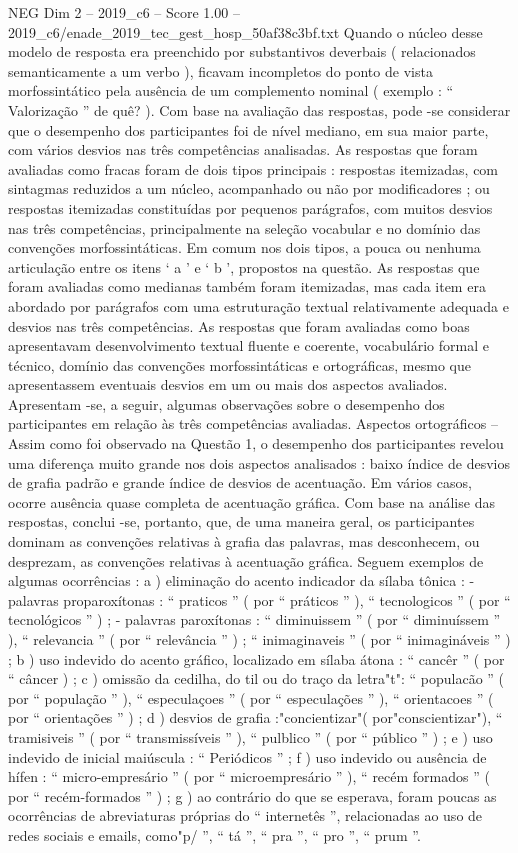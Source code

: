 \begin{textsample}{NEG Dim 2 – 2019\_c6 – Score 1.00 – 2019\_c6/enade\_2019\_tec\_gest\_hosp\_50af38c3bf.txt}
Quando o núcleo desse modelo de resposta era preenchido por substantivos deverbais ( relacionados semanticamente a um verbo ), ficavam incompletos do ponto de vista morfossintático pela ausência de um complemento nominal ( exemplo : “ Valorização ” de quê? ).
Com base na avaliação das respostas, pode -se considerar que o desempenho dos participantes foi de nível mediano, em sua maior parte, com vários desvios nas três competências analisadas.
As respostas que foram avaliadas como fracas foram de dois tipos principais : respostas itemizadas, com sintagmas reduzidos a um núcleo, acompanhado ou não por modificadores ; ou respostas itemizadas constituídas por pequenos parágrafos, com muitos desvios nas três competências, principalmente na seleção vocabular e no domínio das convenções morfossintáticas.
Em comum nos dois tipos, a pouca ou nenhuma articulação entre os itens ‘ a ’ e ‘ b ’, propostos na questão.
As respostas que foram avaliadas como medianas também foram itemizadas, mas cada item era abordado por parágrafos com uma estruturação textual relativamente adequada e desvios nas três competências.
As respostas que foram avaliadas como boas apresentavam desenvolvimento textual fluente e coerente, vocabulário formal e técnico, domínio das convenções morfossintáticas e ortográficas, mesmo que apresentassem eventuais desvios em um ou mais dos aspectos avaliados.
Apresentam -se, a seguir, algumas observações sobre o desempenho dos participantes em relação às três competências avaliadas.
Aspectos ortográficos – Assim como foi observado na Questão 1, o desempenho dos participantes revelou uma diferença muito grande nos dois aspectos analisados : baixo índice de desvios de grafia padrão e grande índice de desvios de acentuação.
Em vários casos, ocorre ausência quase completa de acentuação gráfica.
Com base na análise das respostas, conclui -se, portanto, que, de uma maneira geral, os participantes dominam as convenções relativas à grafia das palavras, mas desconhecem, ou desprezam, as convenções relativas à acentuação gráfica.
Seguem exemplos de algumas ocorrências : a ) eliminação do acento indicador da sílaba tônica : - palavras proparoxítonas : “ praticos ” ( por “ práticos ” ), “ tecnologicos ” ( por “ tecnológicos ” ) ; - palavras paroxítonas : “ diminuissem ” ( por “ diminuíssem ” ), “ relevancia ” ( por “ relevância ” ) ; “ inimaginaveis ” ( por “ inimagináveis ” ) ; b ) uso indevido do acento gráfico, localizado em sílaba átona : “ cancêr ” ( por “ câncer ) ; c ) omissão da cedilha, do til ou do traço da letra"t": “ populacão ” ( por “ população ” ), “ especulaçoes ” ( por “ especulações ” ), “ orientacoes ” ( por “ orientações ” ) ; d ) desvios de grafia :"concientizar"( por"conscientizar"), “ tramisiveis ” ( por “ transmissíveis ” ), “ pulblico ” ( por “ público ” ) ; e ) uso indevido de inicial maiúscula : “ Periódicos ” ; f ) uso indevido ou ausência de hífen : “ micro-empresário ” ( por “ microempresário ” ), “ recém formados ” ( por “ recém-formados ” ) ; g ) ao contrário do que se esperava, foram poucas as ocorrências de abreviaturas próprias do “ internetês ”, relacionadas ao uso de redes sociais e emails, como"p/ ”, “ tá ”, “ pra ”, “ pro ”, “ prum ”.

\end{textsample}
